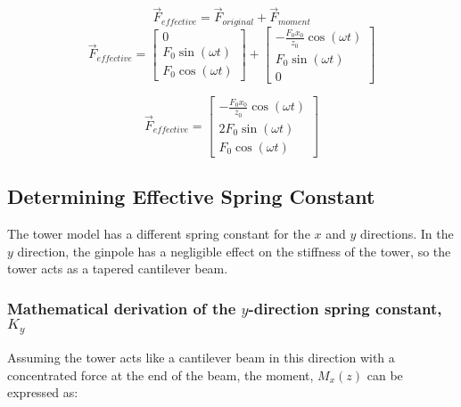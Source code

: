 \begin{equation}\label{eq:effective_force}
	\vec{F}_{effective} = \vec{F}_{original} + \vec{F}_{moment}
\end{equation}
$$ 
	\vec{F}_{effective} = 
	\begin{bmatrix}0\\F_{0} \sin{\left (\omega t \right )}\\F_{0} \cos{\left (\omega t \right )}\end{bmatrix}
	+ \begin{bmatrix}- \frac{F_{0} x_{0}}{z_{0}} \cos{\left (\omega t \right )}\\ F_{0} \sin{\left (\omega t \right )}\\ 0\end{bmatrix}
$$

\begin{equation}
	\vec{F}_{effective} = 
		\left[\begin{matrix}- \frac{F_{0} x_{0}}{z_{0}} \cos{\left (\omega t \right )}\\2 F_{0} \sin{\left (\omega t \right )}\\F_{0} \cos{\left (\omega t \right )}\end{matrix}\right]
\end{equation}

\subsection{Determining Effective Spring Constant}
The tower model has a different spring constant for the $x$ and $y$ directions.  In the $y$ direction, the ginpole has a negligible effect on the stiffness of the tower, so the tower acts as a tapered cantilever beam. 


\subsubsection{Mathematical derivation of the $y$-direction spring constant, $K_y$}
Assuming the tower acts like a cantilever beam in this direction with a concentrated force at the end of the beam, the moment, $M_x(z)$ can be expressed as:

